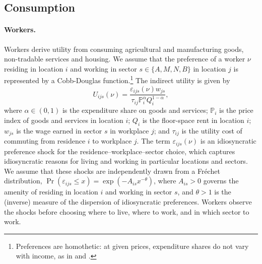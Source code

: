 \documentclass[12pt, unicode, a4paper]{article}
\newcommand{\1}{\mbox{1}\hspace{-0.25em}\mbox{l}} %
\begin{document}
\subsection{Consumption}

\paragraph{Workers.}

Workers derive utility from consuming agricultural and manufacturing goods, non-tradable services and housing. We assume that the preference of a worker $\nu$ residing in location $i$ and working in sector $s \in \{ A,M,N,B \}$ in location $j$ is represented by a Cobb-Douglas function.\footnote{Preferences are homothetic: at given prices, expenditure shares do not vary with income, as in \cite{faber2019tourism} and \cite{fajgelbaum2022argentina}.} 
The indirect utility is given by
\begin{equation}
\label{eq:utility}
    U_{ijs}(\nu)=\frac{\varepsilon_{ijs}(\nu) w_{js}}{\tau_{ij}\mathbb{P}_{i}^\alpha Q_i^{1-\alpha}},
\end{equation}
where $\alpha \in (0,1)$ is the expenditure share on goods and services; $\mathbb{P}_{i}$ is the price index of goods and services in location $i$; $Q_i$ is the floor-space rent in location $i$; $w_{js}$ is the wage earned in sector $s$ in workplace $j$; and $\tau_{ij}$ is the utility cost of commuting from residence $i$ to workplace $j$. The term $\varepsilon_{ijs}(\nu)$ is an idiosyncratic preference shock for the residence--workplace--sector choice, which captures idiosyncratic reasons for living and working in particular locations and sectors. We assume that these shocks are independently drawn from a Fr\'{e}chet distribution, $\Pr\!\left(\varepsilon_{ijs}\leq x\right)=\exp\!\left(-A_{is}x^{-\theta}\right)$, where $A_{is}>0$ governs the amenity of residing in location $i$ and working in sector $s$, and $\theta>1$ is the (inverse) measure of the dispersion of idiosyncratic preferences. Workers observe the shocks before choosing where to live, where to work, and in which sector to work.
\end{document}
